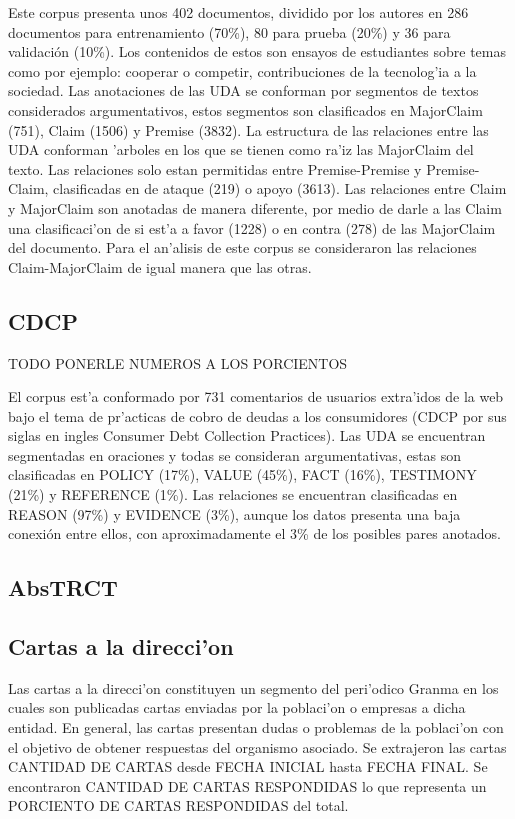 Este corpus presenta unos 402 documentos, dividido por los autores en 286 documentos para entrenamiento (70\%), 
80 para prueba (20\%) y 36 para validación (10\%). Los contenidos de estos son ensayos de estudiantes sobre temas
como por ejemplo: cooperar o competir, contribuciones de la tecnolog'ia a la sociedad.
Las anotaciones de las UDA se conforman por segmentos 
de textos considerados argumentativos, estos segmentos son clasificados en MajorClaim (751), Claim (1506) y Premise (3832).
La estructura de las relaciones entre las UDA conforman 'arboles en los que se tienen como ra'iz las 
MajorClaim del texto. Las relaciones solo estan permitidas entre Premise-Premise y Premise-Claim, clasificadas
en de ataque (219) o apoyo (3613). Las relaciones entre Claim y MajorClaim son anotadas de manera diferente, por medio de 
darle a las Claim una clasificaci'on de si est'a a favor (1228) o en contra (278) de las MajorClaim del documento.
Para el an'alisis de este corpus se consideraron las relaciones Claim-MajorClaim de igual manera que las otras.

\subsection{CDCP}\label{corpus:cdcp}

TODO PONERLE NUMEROS A LOS PORCIENTOS

El corpus est'a conformado por 731 comentarios de usuarios extra'idos de la web bajo el tema de 
pr'acticas de cobro de deudas a los consumidores (CDCP por sus siglas en ingles Consumer Debt Collection Practices).
Las UDA se encuentran segmentadas en oraciones y todas se consideran argumentativas, estas son clasificadas en 
POLICY (17\%), VALUE (45\%), FACT (16\%), TESTIMONY (21\%) y REFERENCE (1\%). Las relaciones se encuentran 
clasificadas en REASON (97\%) y EVIDENCE (3\%), aunque los datos presenta una baja conexión entre ellos, con 
aproximadamente el 3\% de los posibles pares anotados.

\subsection{AbsTRCT}

\subsection{Cartas a la direcci'on}

Las cartas a la direcci'on constituyen un segmento del peri'odico Granma en los cuales son publicadas
cartas enviadas por la poblaci'on o empresas a dicha entidad. En general, las cartas 
presentan dudas o problemas de la poblaci'on con el objetivo de obtener respuestas del organismo
asociado. Se extrajeron las cartas CANTIDAD DE CARTAS desde FECHA INICIAL hasta FECHA FINAL. Se encontraron
CANTIDAD DE CARTAS RESPONDIDAS lo que representa un PORCIENTO DE CARTAS RESPONDIDAS del total. 

